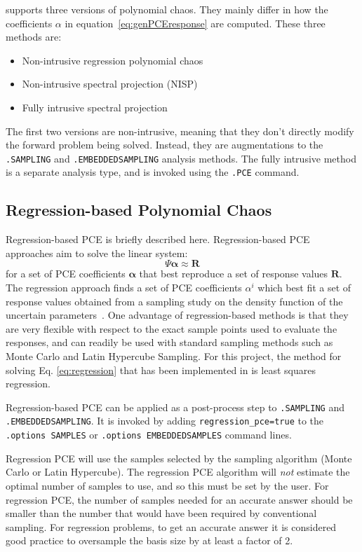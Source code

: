 \Xyce{} supports three versions of polynomial chaos.  They mainly differ in how the coefficients $\alpha$ in equation~\ref{eq:genPCEresponse} are computed.  These three methods are:
\begin{itemize}
  \item Non-intrusive regression polynomial chaos
  \item Non-intrusive spectral projection  (NISP)
  \item Fully intrusive spectral projection
\end{itemize}
The first two versions are non-intrusive, meaning that they don't directly modify the forward problem being solved.  
Instead, they are augmentations to the \texttt{.SAMPLING} and \texttt{.EMBEDDEDSAMPLING} analysis methods.
The fully intrusive method is a separate analysis type, and is invoked using the \texttt{.PCE} command.

\subsection{Regression-based Polynomial Chaos}
\label{regressionPCE}

Regression-based PCE is briefly described here.
Regression-based PCE approaches aim to solve the linear system:
\begin{equation}
\boldsymbol{\varPsi} \boldsymbol{\alpha} \approx \boldsymbol{R} \label{eq:regression}
\end{equation}
for a set of PCE coefficients $\boldsymbol{\alpha}$ that best
reproduce a set of response values $\boldsymbol{R}$.  
The regression approach finds a set of PCE coefficients $\alpha^i$ which best fit a set of response
values obtained from a sampling study on the density function of the uncertain 
parameters~\cite{pt_colloc1}.  One advantage of regression-based methods is that
they are very flexible with respect to the exact sample points used to evaluate the responses, 
and can readily be used with standard sampling methods such as Monte Carlo and Latin Hypercube Sampling.
For this project, the method for solving 
Eq. \eqref{eq:regression} that has been implemented in \Xyce{} is 
least squares regression.

Regression-based PCE can be applied as a post-process step 
to \texttt{.SAMPLING} and \texttt{.EMBEDDEDSAMPLING}.  It is invoked by adding 
\texttt{regression\_pce=true} to the \texttt{.options SAMPLES} 
or \texttt{.options EMBEDDEDSAMPLES} command lines.  

Regression PCE will use the samples selected by the sampling algorithm (Monte Carlo or Latin Hypercube).  
The regression PCE algorithm will \emph{not} estimate the optimal number of samples to use, and so this must 
be set by the user.   For regression PCE, the number of samples needed for an accurate answer
should be smaller than the number that would have been required by conventional sampling.
For regression problems, to get an accurate answer it is considered good practice to oversample 
the basis size by at least a factor of 2. 

